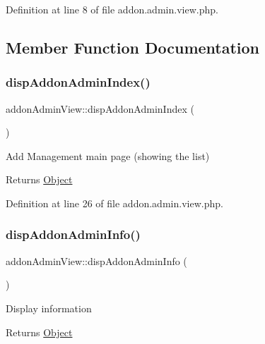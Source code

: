 Definition at line 8 of file addon.\+admin.\+view.\+php.



\subsection{Member Function Documentation}
\hypertarget{classaddonAdminView_ac460e3c832e8209833bd5f50ab41910c}{}\label{classaddonAdminView_ac460e3c832e8209833bd5f50ab41910c} 
\subsubsection{\texorpdfstring{disp\+Addon\+Admin\+Index()}{dispAddonAdminIndex()}}
{\footnotesize\ttfamily addon\+Admin\+View\+::disp\+Addon\+Admin\+Index (\begin{DoxyParamCaption}{ }\end{DoxyParamCaption})}

Add Management main page (showing the list)

\begin{DoxyReturn}{Returns}
\hyperlink{classObject}{Object} 
\end{DoxyReturn}


Definition at line 26 of file addon.\+admin.\+view.\+php.

\hypertarget{classaddonAdminView_a90e6af25e34c4834bd43633da6d83b60}{}\label{classaddonAdminView_a90e6af25e34c4834bd43633da6d83b60} 
\subsubsection{\texorpdfstring{disp\+Addon\+Admin\+Info()}{dispAddonAdminInfo()}}
{\footnotesize\ttfamily addon\+Admin\+View\+::disp\+Addon\+Admin\+Info (\begin{DoxyParamCaption}{ }\end{DoxyParamCaption})}

Display information

\begin{DoxyReturn}{Returns}
\hyperlink{classObject}{Object} 
\end{DoxyReturn}


